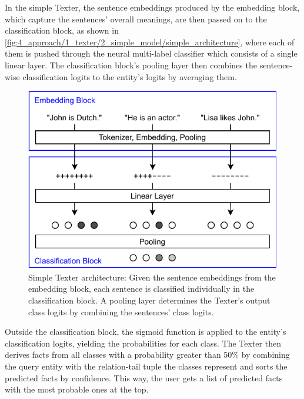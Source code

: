 In the simple Texter, the sentence embeddings produced by the embedding block, which capture the sentences' overall meanings, are then passed on to the classification block, as shown in \autoref{fig:4_approach/1_texter/2_simple_model/simple_architecture}, where each of them is pushed through the neural multi-label classifier which consists of a single linear layer. The classification block's pooling layer then combines the sentence-wise classification logits to the entity's logits by averaging them.

\begin{figure}[t]
    \centering
    \includegraphics{4_approach/1_texter/2_simple_model/simple_architecture}
    \caption{Simple Texter architecture: Given the sentence embeddings from the embedding block, each sentence is classified individually in the classification block. A pooling layer determines the Texter's output class logits by combining the sentences' class logits.}
    \label{fig:4_approach/1_texter/2_simple_model/simple_architecture}
\end{figure}

Outside the classification block, the sigmoid function is applied to the entity's classification logits, yielding the probabilities for each class. The Texter then derives facts from all classes with a probability greater than 50\% by combining the query entity with the relation-tail tuple the classes represent and sorts the predicted facts by confidence. This way, the user gets a list of predicted facts with the most probable ones at the top.
